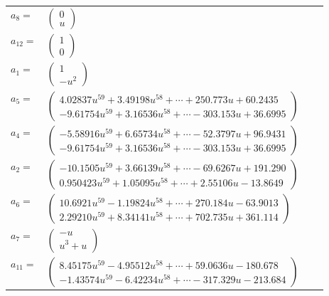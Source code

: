 \documentclass[1p]{elsarticle_modified}
\theoremstyle{definition}
\begin{document}
\begin{tabular}{m{7pt} m{180pt} m{7pt} m{180pt} }
\flushright $a_{8}=$&$\begin{pmatrix}0\\u\end{pmatrix}$ \\
\flushright $a_{12}=$&$\begin{pmatrix}1\\0\end{pmatrix}$ \\
\flushright $a_{1}=$&$\begin{pmatrix}1\\- u^2\end{pmatrix}$ \\
\flushright $a_{5}=$&$\begin{pmatrix}4.02837 u^{59}+3.49198 u^{58}+\cdots+250.773 u+60.2435\\-9.61754 u^{59}+3.16536 u^{58}+\cdots-303.153 u+36.6995\end{pmatrix}$ \\
\flushright $a_{4}=$&$\begin{pmatrix}-5.58916 u^{59}+6.65734 u^{58}+\cdots-52.3797 u+96.9431\\-9.61754 u^{59}+3.16536 u^{58}+\cdots-303.153 u+36.6995\end{pmatrix}$ \\
\flushright $a_{2}=$&$\begin{pmatrix}-10.1505 u^{59}+3.66139 u^{58}+\cdots-69.6267 u+191.290\\0.950423 u^{59}+1.05095 u^{58}+\cdots+2.55106 u-13.8649\end{pmatrix}$ \\
\flushright $a_{6}=$&$\begin{pmatrix}10.6921 u^{59}-1.19824 u^{58}+\cdots+270.184 u-63.9013\\2.29210 u^{59}+8.34141 u^{58}+\cdots+702.735 u+361.114\end{pmatrix}$ \\
\flushright $a_{7}=$&$\begin{pmatrix}- u\\u^3+u\end{pmatrix}$ \\
\flushright $a_{11}=$&$\begin{pmatrix}8.45175 u^{59}-4.95512 u^{58}+\cdots+59.0636 u-180.678\\-1.43574 u^{59}-6.42234 u^{58}+\cdots-317.329 u-213.684\end{pmatrix}$ \\

\end{tabular}
\end{document}
